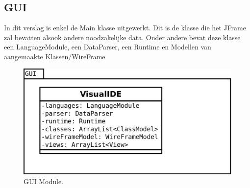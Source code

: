 \documentclass[]{article}
\begin{document}
\subsection{GUI}
In dit verslag is enkel de Main klasse uitgewerkt. Dit is de klasse die het JFrame zal bevatten alsook andere noodzakelijke data. Onder andere bevat deze klasse een LanguageModule, een DataParser, een Runtime en Modellen van aangemaakte Klassen/WireFrame

 \begin{figure}[h]
  \centering
   
\includegraphics[scale=0.4]{./AnalyseClassenDiagram/gui.png}
  \caption{GUI Module.} \label{gui}
\end{figure}
\clearpage


 
\end{document}
